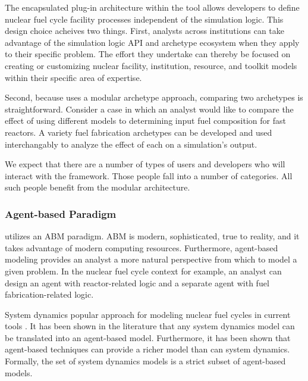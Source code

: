 The encapsulated plug-in architecture within the \Cyclus tool allows developers 
to define nuclear fuel cycle facility processes independent of the simulation 
logic. This design choice acheives two things. First, analysts across 
institutions can take advantage of the simulation logic \gls{API} and 
archetype ecosystem when they apply \Cyclus to their specific problem. The effort they 
undertake can thereby be focused on creating or customizing 
nuclear facility, institution, resource, and toolkit models within their 
specific area of expertise.

Second, because \Cyclus uses a modular archetype approach, comparing two 
archetypes is straightforward. Consider a case in which an analyst would like 
to compare the effect of using different models to determining input fuel 
composition for fast reactors. A variety fuel fabrication archetypes can be 
developed and used interchangably to analyze the effect of each on a 
simulation's output.

We expect that there are a number of types of users and developers who will 
interact with the \Cyclus framework. Those people fall into a number of 
categories. All such people benefit from the modular architecture. 

\subsubsection{Agent-based Paradigm}

\Cyclus utilizes an \gls{ABM} paradigm.  \gls{ABM} is modern, sophisticated, 
true to reality, and it takes advantage of modern computing resources. 
Furthermore, agent-based modeling provides an analyst a more natural 
perspective from which to model a given problem. In the nuclear fuel cycle 
context for example, an analyst can design an agent with reactor-related logic 
and a separate agent with fuel fabrication-related logic.  

System dynamics popular approach for modeling nuclear fuel cycles in current
tools \cite{VISION,CAFCA}. It has been shown in the literature
\cite{macal_agent-based_2010} that any system dynamics model can be translated
into an agent-based model. Furthermore, it has been shown that agent-based
techniques can provide a richer model than can system dynamics. Formally, the
set of system dynamics models is a strict subset of agent-based models.



